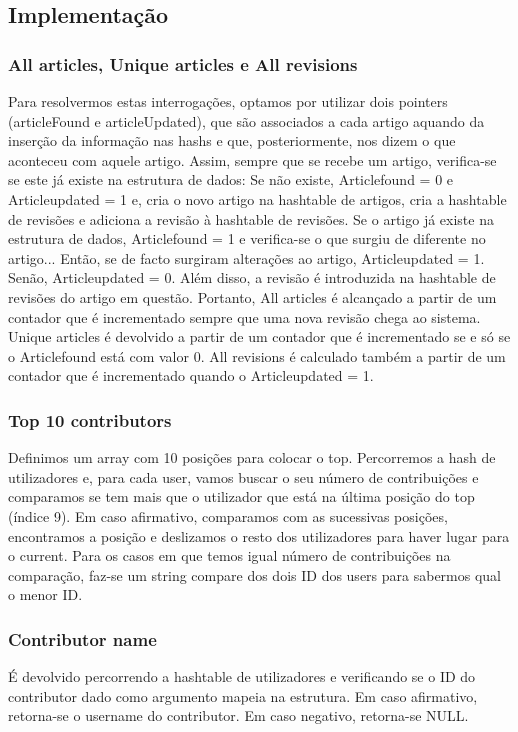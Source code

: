 \documentclass[a4paper]{article}
\begin{document}
\subsection{Implementação}

\subsubsection{All articles, Unique articles e All revisions}
Para resolvermos estas interrogações, optamos por utilizar dois pointers (articleFound e articleUpdated), que são associados a cada artigo aquando da inserção da informação nas hashs e que, posteriormente, nos dizem o que aconteceu com aquele artigo. 
Assim, sempre que se recebe um artigo, verifica-se se este já existe na estrutura de dados:
Se não existe, Articlefound = 0 e Articleupdated = 1 e, cria o novo artigo na hashtable de artigos, cria a hashtable de revisões e adiciona a revisão à hashtable de revisões.
Se o artigo já existe na estrutura de dados, Articlefound = 1 e verifica-se o que surgiu de diferente no artigo... Então, se de facto surgiram alterações ao artigo, Articleupdated = 1. Senão, Articleupdated = 0. Além disso, a revisão é introduzida na hashtable de revisões do artigo em questão.
Portanto, All articles é alcançado a partir de um contador que é incrementado sempre que uma nova revisão chega ao sistema. Unique articles é devolvido a partir de um contador que é incrementado se e só se o Articlefound está com valor 0. All revisions é calculado também a partir de um contador que é incrementado quando o Articleupdated = 1.

\subsubsection{Top 10 contributors}
Definimos um array com 10 posições para colocar o top. Percorremos a hash de utilizadores e, para cada user, vamos buscar o seu número de contribuições e comparamos se tem mais que o utilizador que está na última posição do top (índice 9). Em caso afirmativo, comparamos com as sucessivas posições, encontramos a posição e deslizamos o resto dos utilizadores para haver lugar para o current. Para os casos em que temos igual número de contribuições na comparação, faz-se um string compare dos dois ID dos users para sabermos qual o menor ID.

\subsubsection{Contributor name}
É devolvido percorrendo a hashtable de utilizadores e verificando se o ID do contributor dado como argumento mapeia na estrutura. Em caso afirmativo, retorna-se o username do contributor. Em caso negativo, retorna-se NULL.
\end{document}
